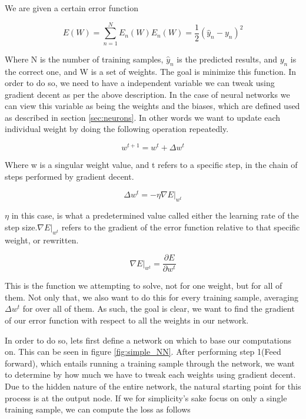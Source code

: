 We are given a certain error function

$$
E(W) = \sum_{n=1}^N E_n(W)
E_n(W) = \frac{1}{2}(\hat{y}_n - y_n)^2
$$

Where N is the number of training samples, $\hat{y}_n$ is the predicted results,
and $y_n$ is the correct one, and W is a set of weights. The goal is minimize
this function. In order to do so, we need to have a independent variable we
can tweak using gradient decent as per the above description. In the case of
neural networks we can view this variable as being the weights and the biases,
which are defined used as described in section \ref{sec:neurons}. In other
words we want to update each individual weight by doing the following operation
repeatedly.

\begin{equation}\label{eq:update}
w^{t+1} = w^t + \Delta w^t
\end{equation}

Where w is a singular weight value, and t refers to a specific step, in the 
chain of steps performed by gradient decent.

\begin{equation}
\Delta w^t = -\eta \nabla E|_{w^t}
\end{equation}

$\eta$ in this case, is what a predetermined value called either the learning rate
of the step size.$\nabla E|_{w^t}$ refers to the gradient of the error function
relative to that specific weight, or rewritten.

$$
\nabla E|_{w^t} = \frac{\partial E}{\partial w^t}
$$


This is the function we attempting to solve, not for one weight, but for all
of them. Not only that, we also want to do this for every training sample,
averaging $\Delta w^t$ for over all of them. As such, the goal is clear, we want
to find the gradient of our error function with respect to all the weights in
our network.

In order to do so, lets first define a network on which to base our computations
on. This can be seen in figure \ref{fig:simple_NN}. After performing step 1(Feed
forward), which entails running a training sample through the network, we want
to determine by how much we have to tweak each weights using gradient decent.
Due to the hidden nature of the entire network, the natural starting point for 
this process is at the output node. If we for simplicity's sake focus on only a
single training sample, we can compute the loss as follows

